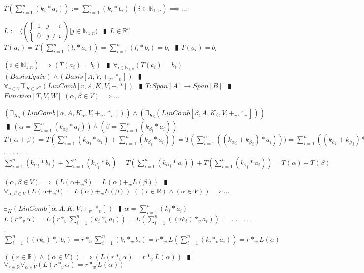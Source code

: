 \documentclass{book}
\newcommand{\abr}{:=}
\newcommand{\cont}{\phantom{.}. . .\phantom{.}}
\newcommand{\pipe}{$\phantom{(}\vrectangleblack\phantom{)}$}
\begin{document}
\begin{enumerate}
  \lit $T(\sum_{i = 1}^{n}(k_i * a_i)) \abr \sum_{i = 1}^{n}(k_i * b_i)$
  \lit $(i \in \mathbb{N}_{1, n}) \implies \ldots$
  \begin{enumerate}
    \lit $L \abr \langle \left(\begin{cases} 
      1 & j = i \\
      0 & j \neq i 
    \end{cases}\right) | j \in \mathbb{N}_{1, n} \rangle$ \pipe $L \in \mathbb{R}^n$
    \lit $T(a_i) = T(\sum_{i = 1}^{n}(l_i * a_i)) = \sum_{i = 1}^{n}(l_i * b_i) = b_i$ \pipe $T(a_i) = b_i$
  \end{enumerate}
  \lit $(i \in \mathbb{N}_{1, n}) \implies (T(a_i) = b_i)$ \pipe $\forall_{i \in \mathbb{N}_{1, n}}(T(a_i) = b_i)$
  \lit $(BasisEquiv) \land (Basis[A, V, +_v, *_v])$ \pipe $\forall_{v \in V} \exists!_{K \in \mathbb{R}^n}(LinComb[v, A, K, V, +, *])$ \pipe $T: Span[A] \rightarrow Span[B]$ \pipe $Function[T, V, W]$
  \lit $(\alpha, \beta \in V) \implies \ldots$
  \begin{enumerate}
    \lit $(\exists_{K_\alpha}(LinComb[\alpha, A, K_\alpha, V, +_v, *_v])) \land (\exists_{K_\beta}(LinComb[\beta, A, K_\beta, V, +_v, *_v]))$ \pipe $(\alpha = \sum_{i = 1}^{n}({k_\alpha}_i * a_i)) \land (\beta = \sum_{i = 1}^{n}({k_\beta}_i * a_i))$
    \lit $T(\alpha + \beta) = T(\sum_{i = 1}^{n}({k_\alpha}_i * a_i) + \sum_{i = 1}^{n}({k_\beta}_i * a_i)) = T(\sum_{i = 1}^{n}(({k_\alpha}_i + {k_\beta}_i) * a_i))) = \sum_{i = 1}^{n}(({k_\alpha}_i + {k_\beta}_i) * b_i) = $ \cont
    \lit \cont $\sum_{i = 1}^{n}({k_\alpha}_i * b_i) + \sum_{i = 1}^{n}({k_\beta}_i * b_i) = T(\sum_{i = 1}^{n}({k_\alpha}_i * a_i)) + T(\sum_{i = 1}^{n}({k_\beta}_i * a_i)) = T(\alpha) + T(\beta)$
  \end{enumerate}
  \lit $(\alpha, \beta \in V) \implies (L(\alpha +_v \beta) = L(\alpha) +_w L(\beta))$ \pipe $\forall_{\alpha, \beta \in V}(L(\alpha +_v \beta) = L(\alpha) +_w L(\beta))$
  \lit $((r \in \mathbb{R}) \land (\alpha \in V)) \implies \ldots$
  \begin{enumerate}
    \lit $\exists_{K}(LinComb[\alpha, A, K, V, +_v, *_v])$ \pipe $\alpha = \sum_{i = 1}^{n}(k_i * a_i)$
    \lit $L(r *_v \alpha) = L(r *_v \sum_{i = 1}^{n}(k_i *_v a_i)) = L(\sum_{i = 1}^{n}((r k_i) *_v a_i)) = $ \cont
    \lit \cont $\sum_{i = 1}^{n}((r k_i) *_w b_i) = r *_w \sum_{i = 1}^{n}(k_i *_w b_i) = r *_w L(\sum_{i = 1}^{n}(k_i *_v a_i)) = r *_w L(\alpha)$
  \end{enumerate}
  \lit $((r \in \mathbb{R}) \land (\alpha \in V)) \implies (L(r *_v \alpha) = r *_w L(\alpha))$ \pipe $\forall_{r \in \mathbb{R}} \forall_{\alpha \in V}(L(r *_v \alpha) = r *_w L(\alpha))$

\end{enumerate}
\end{document}

